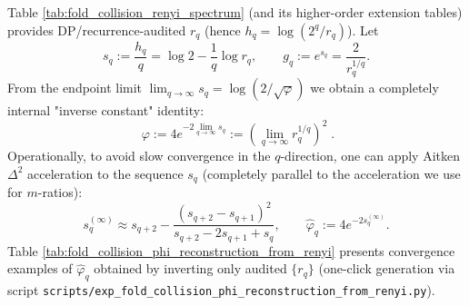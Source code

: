 \begin{remark}\label{rem:pom-recover-phi-from-collision-spectrum}
Table \ref{tab:fold_collision_renyi_spectrum} (and its higher-order extension tables) provides DP/recurrence-audited \(r_q\) (hence \(h_q=\log(2^q/r_q)\)).
Let
\[
s_q:=\frac{h_q}{q}=\log 2-\frac{1}{q}\log r_q,
\qquad
g_q:=e^{s_q}=\frac{2}{r_q^{1/q}}.
\]
From the endpoint limit \(\lim_{q\to\infty}s_q=\log(2/\sqrt{\varphi})\) we obtain a completely internal "inverse constant" identity:
\[
\boxed{\;
\varphi
:=4e^{-2\lim_{q\to\infty}s_q}
:=\left(\lim_{q\to\infty}r_q^{1/q}\right)^2\; }.
\]
Operationally, to avoid slow convergence in the \(q\)-direction, one can apply Aitken \(\Delta^2\) acceleration to the sequence \(s_q\) (completely parallel to the acceleration we use for \(m\)-ratios):
\[
s_q^{(\infty)}
\approx
s_{q+2}-\frac{(s_{q+2}-s_{q+1})^2}{s_{q+2}-2s_{q+1}+s_q},
\qquad
\widehat\varphi_q:=4e^{-2s_q^{(\infty)}}.
\]
Table \ref{tab:fold_collision_phi_reconstruction_from_renyi} presents convergence examples of \(\widehat\varphi_q\) obtained by inverting only audited \(\{r_q\}\) (one-click generation via script \texttt{scripts/exp\_fold\_collision\_phi\_reconstruction\_from\_renyi.py}).
\end{remark}



